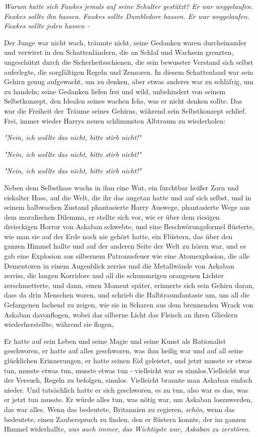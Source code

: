 {\emph{Warum hatte sich Fawkes jemals auf seine Schulter gestützt? Er war weggelaufen. Fawkes sollte ihn hassen. Fawkes sollte Dumbledore hassen. Er war weggelaufen. Fawkes sollte jeden hassen -}

Der Junge war nicht wach, träumte nicht, seine Gedanken waren durcheinander und verwirrt in den Schattenländern, die an Schlaf und Wachsein grenzten, ungeschützt durch die Sicherheitsschienen, die sein bewusster Verstand sich selbst auferlegte, die sorgfältigen Regeln und Zensoren. In diesem Schattenland war sein Gehirn genug aufgewacht, um zu denken, aber etwas anderes war zu schläfrig, um zu handeln; seine Gedanken liefen frei und wild, unbehindert von seinem Selbstkonzept, den Idealen seines wachen Ichs, was er nicht denken sollte. Das war die Freiheit der Träume seines Gehirns, während sein Selbstkonzept schlief. Frei, immer wieder Harrys neuen schlimmsten Albtraum zu wiederholen:

\emph{"Nein, ich wollte das nicht, bitte stirb nicht!"}

\emph{"Nein, ich wollte das nicht, bitte stirb nicht!"}

\emph{"Nein, ich wollte das nicht, bitte stirb nicht!"}

Neben dem Selbsthass wuchs in ihm eine Wut, ein furchtbar heißer Zorn und eiskalter Hass, auf die Welt, die ihr das angetan hatte und auf sich selbst, und in seinem halbwachen Zustand phantasierte Harry Auswege, phantasierte Wege aus dem moralischen Dilemma, er stellte sich vor, wie er über dem riesigen dreieckigen Horror von Askaban schwebte, und eine Beschwörungsformel flüsterte, wie man sie auf der Erde noch nie gehört hatte, ein Flüstern, das über den ganzen Himmel hallte und auf der anderen Seite der Welt zu hören war, und es gab eine Explosion aus silbernem Patronusfeuer wie eine Atomexplosion, die alle Dementoren in einem Augenblick zerriss und die Metallwände von Askaban zerriss, die langen Korridore und all die schummrigen orangenen Lichter zerschmetterte, und dann, einen Moment später, erinnerte sich sein Gehirn daran, dass da drin Menschen waren, und schrieb die Halbtraumfantasie um, um all die Gefangenen lachend zu zeigen, wie sie in Scharen aus dem brennenden Wrack von Askaban davonflogen, wobei das silberne Licht das Fleisch an ihren Gliedern wiederherstellte, während sie flogen,

Er hatte auf sein Leben und seine Magie und seine Kunst als Rationalist geschworen, er hatte auf alles geschworen, was ihm heilig war und auf all seine glücklichen Erinnerungen, er hatte seinen Eid geleistet, und jetzt musste er etwas tun, musste etwas tun, musste etwas tun - vielleicht war es sinnlos.Vielleicht war der Versuch, Regeln zu befolgen, sinnlos. Vielleicht brannte man Askaban einfach nieder. Und tatsächlich hatte er sich geschworen, es zu tun, also war es das, was er jetzt tun musste. Er würde alles tun, was nötig war, um Askaban loszuwerden, das war alles. Wenn das bedeutete, Britannien zu regieren, \emph{schön}, wenn das bedeutete, einen Zauberspruch zu finden, den er flüstern konnte, der im ganzen Himmel widerhallte, \emph{was auch immer,} \emph{das Wichtigste war, Askaban zu zerstören.}

}
